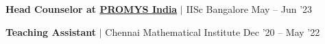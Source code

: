 \resumeProjectHeading
{\textbf{Head Counselor at \href{https://promys-india.org}{PROMYS India}} $|$ IISc Bangalore}
{May -- Jun '23}
\vspace{-20pt}


\resumeProjectHeading
{\textbf{Teaching Assistant} $|$ Chennai Mathematical Institute }
{Dec '20 -- May '22}{}
\vspace{-20pt}

